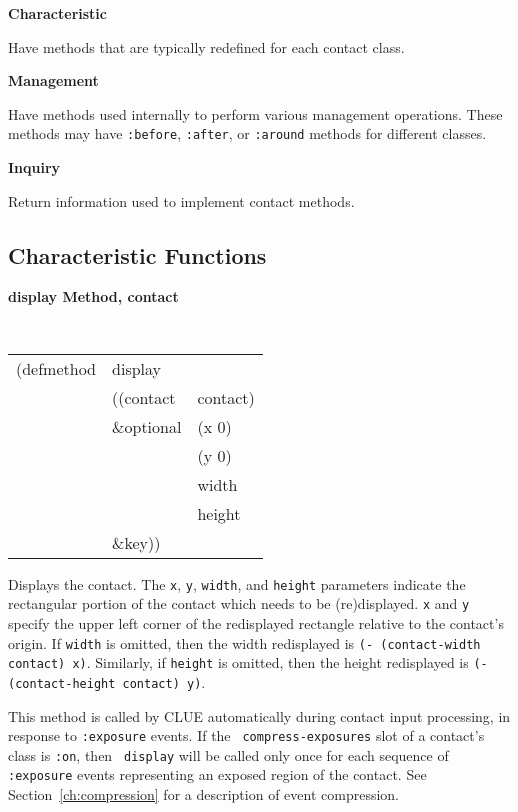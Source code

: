 \documentclass[twoside]{book}
\begin{document}
\begin{sloppy}
\begin{center}
\parbox[t]{1in}{{\bf Characteristic}} \hspace{.125in} \parbox[t]{4in}{Have
methods that are typically redefined for each contact class.} 

\parbox[t]{1in}{{\bf Management}} \hspace{.125in} \parbox[t]{4in}{Have methods
used
internally to perform various management operations. These methods  may have
{\tt :before}, {\tt :after}, or {\tt :around} methods for different classes.} 

\parbox[t]{1in}{{\bf Inquiry}} \hspace{.125in} \parbox[t]{4in}{Return
information used to implement contact methods.} 
\end{center}

{\samepage
\subsection*{Characteristic Functions}

{\large {\bf display \hfill Method, contact}}
\begin{flushright}
\parbox[t]{6.125in}{
\tt
\begin{tabular}{lll}
\raggedright
(defmethod & display & \\
& ((contact  &contact)\\
& \&optional & (x 0)\\
& & (y 0)\\
& & width \\
& & height\\
& \&key))
\end{tabular}}\end{flushright}
}

\begin{flushright} \parbox[t]{6.125in}
{ Displays the contact. The {\tt x},
{\tt y}, {\tt width}, and {\tt height} parameters indicate the rectangular
portion of the contact which needs to be (re)displayed. {\tt x} and {\tt y}
specify the upper left corner of the redisplayed rectangle relative to the
contact's origin. If {\tt width} is omitted, then the width redisplayed is
{\tt (- (contact-width contact) x)}. Similarly, if {\tt height} is omitted,
then the height redisplayed is {\tt (- (contact-height contact) y)}.

This method is called by CLUE automatically during contact input
processing, in response to {\tt :exposure} events. If the {\tt
compress-exposures} slot of a contact's class is {\tt :on}, then {\tt
display} will be called only once for each sequence of {\tt :exposure}
events representing an exposed region of the contact.  See Section~\ref{ch:compression}
for a description of event compression.

}
\end{flushright}
\end{sloppy}
\end{document}
